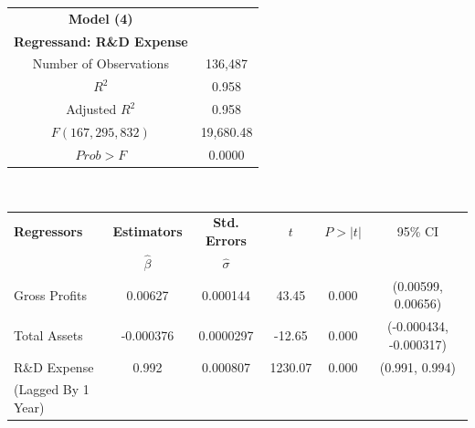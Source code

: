 \newpage
\begin{table}[h]
\begin{tabular}{ c | c }
	\hline
	\textbf{Model (4)} \\
    \textbf{Regressand: R\&D Expense} \\
    \hline \hline
    Number of Observations & 136,487 \\
	\hline
    $R^{2}$ & 0.958 \\
    Adjusted $R^{2}$ & 0.958 \\
    \hline
    $F(167, 295,832)$ & 19,680.48 \\
    $Prob > F$ & 0.0000 \\
    \hline \hline
\end{tabular} \\
\begin{tabular}{ l | c | c | c | c | c }
	\hline
	\textbf{Regressors} & \textbf{Estimators} & \textbf{Std. Errors} & $t$ & $P > |t|$ & 95\% CI \\
    & $\hat{\beta}$ & $\hat{\sigma}$ & & & \\
    \hline \hline
	Gross Profits & 0.00627 & 0.000144  & 43.45 & 0.000 & (0.00599, 0.00656) \\
	\hline
    Total Assets & -0.000376 & 0.0000297 & -12.65 & 0.000 & (-0.000434, -0.000317) \\
    \hline
    R\&D Expense & 0.992 & 0.000807 & 1230.07 & 0.000 & (0.991, 0.994) \\
    (Lagged By 1 Year) & & & & & \\
    \hline \hline
\end{tabular}
\end{table}

